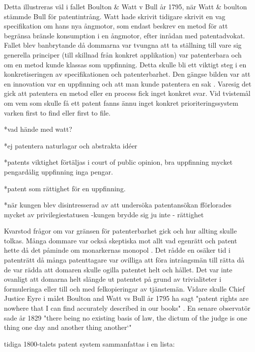 Detta illustreras väl i fallet Boulton \& Watt v Bull år 1795, när Watt \& boulton stämmde Bull för patentintrång. Watt hade skrivit tidigare skrivit en vag specifikation om hans nya ångmotor, som endast beskrev en metod för att begränsa bränsle konsumption i en ångmotor, efter inrådan med patentadvokat\cite{bracha}. Fallet blev banbrytande då dommarna var tvungna att ta ställning till vare sig generella principer (till skillnad från konkret applikation) var patenterbara och om en metod kunde klassas som uppfinning\cite{bracha}. Detta skulle bli ett viktigt steg i en konkretiseringen av specifikationen och patenterbarhet. Den gängse bilden var att en innovation var en uppfinning och att man kunde patentera en sak \cite{bracha}. Varesig det gick att patentera en metod eller en process fick inget konkret svar. Vid tvistemål om vem som skulle få ett patent fanns ännu inget konkret prioriteringssystem varken first to find eller first to file\cite{bracha}.

*vad hände med watt?

*ej patentera naturlagar och abstrakta idéer 

*patents viktighet förtäljas i court of public opinion, bra uppfinning mycket pengardålig uppfinning inga pengar.

*patent som rättighet för en uppfinning.

*när kungen blev disintresserad av att undersöka patentansökan fförlorades mycket av privilegiestatusen -kungen brydde sig ju inte - rättighet


Kvarstod frågor om var gränsen för patenterbarhet gick och hur allting skulle tolkas\cite{bracha}. Många dommare var också skeptiska mot allt vad egenrätt och patent hette då det påminde om monarkernas monopol \cite{macleod}.
Det rådde en osäker tid i patenträtt då många patenttagare var ovilliga att föra intrångsmän till
rätta då de var rädda att domaren skulle ogilla patentet helt och hållet. Det var inte ovanligt att
domarna helt slängde ut patentet på grund av trivialiteter i formuleringa eller till och med
felkopieringar av tjänstemän\cite{macleod}. Vidare skulle Chief Justice Eyre i målet Boulton and Watt vs Bull år 1795 ha sagt "patent rights are nowhere that I can find accurately described in our books" \cite{macleod}. En senare observatör sade år 1829 "there being no existing basis of law, the dictum of the judge is 
one thing one day and another thing another‘" \cite{macleod}

tidiga 1800-talets patent system sammanfattas i en lista:

